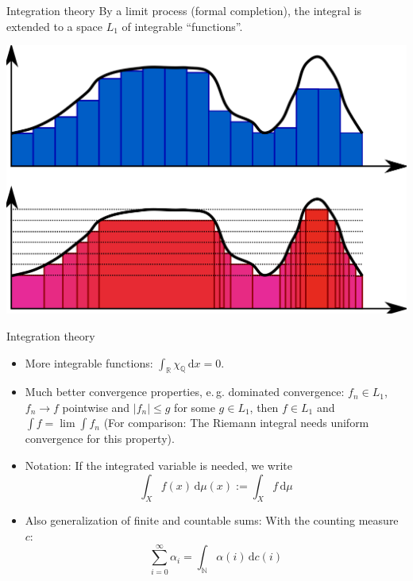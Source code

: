 \documentclass[compress]{beamer}
\newcommand{\RR}{\mathbb{R}}
\newcommand{\QQ}{\mathbb{Q}}
\newcommand{\NN}{\mathbb{N}}
\newcommand{\td}{\,\mathrm{d}}  %
\begin{document}
\begin{frame}{Integration theory}
  By a limit process (formal completion), the integral is extended to a space
  $L_1$ of integrable ``functions''.
  \begin{center}
    \includegraphics[width=0.7\linewidth]{Riemannvslebesgue.png}
  \end{center}
\end{frame}

\begin{frame}{Integration theory}
  \begin{itemize}
  \item More integrable functions: $\int_\RR \chi_\QQ \td x= 0$.
  \item Much better convergence properties, e.\,g. dominated convergence: $f_n
    \in L_1$, $f_n \to f$ pointwise and $|f_n|\leq g$ for some $g \in L_1$, then
    $f \in L_1$ and $\int f = \lim \int f_n$ (For comparison: The Riemann
    integral needs uniform convergence for this property).
  \item Notation: If the integrated variable is needed, we write
   \[
     \int_X f(x) \td \mu(x) := \int_X f\td \mu
   \]
 \item Also generalization of finite and countable sums: With the counting
   measure $c$:
    \[ \sum_{i=0}^\infty \alpha_i = \int_\NN \alpha(i) \td c(i) \]
  \end{itemize}
\end{frame}
\end{document}
